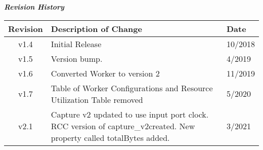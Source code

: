 \iffalse
This file is protected by Copyright. Please refer to the COPYRIGHT file
distributed with this source distribution.

This file is part of OpenCPI <http://www.opencpi.org>

OpenCPI is free software: you can redistribute it and/or modify it under the
terms of the GNU Lesser General Public License as published by the Free Software
Foundation, either version 3 of the License, or (at your option) any later
version.

OpenCPI is distributed in the hope that it will be useful, but WITHOUT ANY
WARRANTY; without even the implied warranty of MERCHANTABILITY or FITNESS FOR A
PARTICULAR PURPOSE. See the GNU Lesser General Public License for more details.

You should have received a copy of the GNU Lesser General Public License along
with this program. If not, see <http://www.gnu.org/licenses/>.
\fi

\def\comp{capture\_{}v2}
\edef\ecomp{capture_v2}
\def\Comp{Capture v2}
\def\docTitle{\Comp{} Component Data Sheet}
\def\snippetpath{../../../../../../doc/av/tex/snippets}



\maketitle
\thispagestyle{empty}
\newpage

\begin{center}
	\textit{\textbf{Revision History}}
	\begin{table}[H]
		\label{table:revisions} %
		\begin{tabularx}{\textwidth}{|c|X|l|}
			\hline
			\rowcolor{blue}
			\textbf{Revision} & \textbf{Description of Change} & \textbf{Date} \\
		    \hline
		    v1.4 & Initial Release & 10/2018 \\
		    \hline
            v1.5 & Version bump. & 4/2019 \\
		    \hline
		     v1.6 & Converted Worker to version 2 & 11/2019 \\
		    \hline
		    v1.7 & Table of Worker Configurations and Resource Utilization Table removed & 5/2020 \\
		    \hline
		    v2.1 & {\Comp} updated to use input port clock. RCC version of \comp created. New property called totalBytes added.  & 3/2021 \\
	            \hline
		\end{tabularx}
	\end{table}
\end{center}
\newpage

